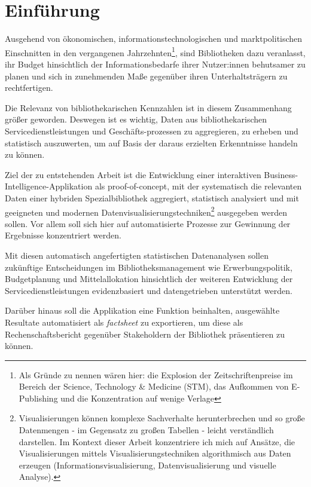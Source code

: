 \chapter{Einführung}
%
Ausgehend von ökonomischen, informationstechnologischen und marktpolitischen Einschnitten in den
vergangenen Jahrzehnten\footnote{Als Gründe zu nennen wären hier: die Explosion der Zeitschriftenpreise im Bereich der
Science, Technology \& Medicine (STM), das Aufkommen von E-Publishing und die Konzentration auf wenige
Verlage},
sind Bibliotheken dazu veranlasst, ihr Budget hinsichtlich der Informationsbedarfe
ihrer Nutzer:innen behutsamer zu planen und sich in zunehmenden Maße gegenüber ihren Unterhaltsträgern zu rechtfertigen.

Die Relevanz von bibliothekarischen Kennzahlen ist in diesem Zusammenhang größer geworden.
Deswegen ist es wichtig, Daten aus bibliothekarischen Servicedienstleistungen und Geschäfts-prozessen zu aggregieren, zu erheben und statistisch
auszuwerten, um auf Basis der daraus erzielten Erkenntnisse handeln zu können.

Ziel der zu entstehenden Arbeit ist die Entwicklung einer
interaktiven Business-Intelligence-Applikation als proof-of-concept,
mit der systematisch die relevanten Daten einer hybriden Spezialbibliothek aggregiert, statistisch
analysiert und mit geeigneten und modernen Datenvisualisierungstechniken\footnote{Visualisierungen können komplexe Sachverhalte herunterbrechen und
so große Datenmengen - im Gegensatz zu großen Tabellen - leicht verständlich
darstellen. Im Kontext dieser Arbeit konzentriere ich mich auf Ansätze, die Visualisierungen mittels Visualisierungstechniken algorithmisch aus
Daten erzeugen (Informationsvisualisierung, Datenvisualisierung und visuelle Analyse).\cite{RN100}}
ausgegeben werden sollen.
Vor allem soll sich hier auf automatisierte Prozesse zur Gewinnung der Ergebnisse konzentriert werden.

Mit diesen automatisch angefertigten statistischen Datenanalysen sollen zukünftige
Entscheidungen im Bibliotheksmanagement wie Erwerbungspolitik, Budgetplanung und
Mittelallokation hinsichtlich der weiteren Entwicklung der
Servicedienstleistungen evidenzbasiert und datengetrieben unterstützt werden.

Darüber hinaus soll die Applikation  eine Funktion beinhalten, ausgewählte
Resultate automatisiert als \textit{factsheet} zu exportieren, um diese
als Rechenschaftsbericht gegenüber Stakeholdern der Bibliothek präsentieren zu können.

